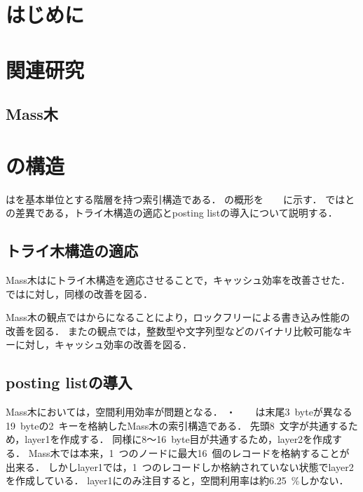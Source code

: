 
\section{はじめに}

\section{関連研究}
\label{sec:relatedwork}

\subsection{\Bctree{}}
\subsection{Mass木}

\section{\Bcforest{}の構造}
\label{sec:bc_forest_structure}

\Bcforest{}は\Bctree{}を基本単位とする階層を持つ索引構造である．
\Bcforest{}の概形を　　に示す．
\Sec{\ref{sec:bc_forest_structure}}では\Bctree{}との差異である，トライ木構造の適応とposting listの導入について説明する．

\subsection{トライ木構造の適応}

Mass木は\Bptree{}にトライ木構造を適応させることで，キャッシュ効率を改善させた．
\Bcforest{}では\Bctree{}に対し，同様の改善を図る．

Mass木の観点では\Bptree{}から\Bctree{}になることにより，ロックフリーによる書き込み性能の改善を図る．
また\Bctree{}の観点では，整数型や文字列型などのバイナリ比較可能なキーに対し，キャッシュ効率の改善を図る．

\subsection{posting listの導入}

Mass木においては，空間利用効率が問題となる．
・　　は末尾3~byteが異なる19~byteの2~キーを格納したMass木の索引構造である．
先頭8~文字が共通するため，layer1を作成する．
同様に8～16~byte目が共通するため，layer2を作成する．
Mass木では本来，1~つのノードに最大16~個のレコードを格納することが出来る．
しかしlayer1では，1~つのレコードしか格納されていない状態でlayer2を作成している．
layer1にのみ注目すると，空間利用率は約6.25~\%しかない．

